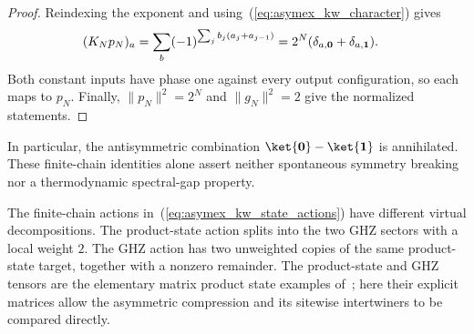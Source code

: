 \begin{proof}
    \leanok
    Reindexing the exponent and using~(\ref{eq:asymex_kw_character})
    gives
    \begin{align}
        (K_Np_N)_a
         & =\sum_b(-1)^{\sum_jb_j(a_j+a_{j-1})}
        =2^N(\delta_{a,\mathbf0}+\delta_{a,\mathbf1}).
        \notag
    \end{align}
    Both constant inputs have phase one against every output
    configuration, so each maps to $p_N$. Finally,
    $\|p_N\|^2=2^N$ and $\|g_N\|^2=2$ give the normalized statements.
\end{proof}

In particular, the antisymmetric combination
$\ket{\mathbf0}-\ket{\mathbf1}$ is annihilated. These finite-chain
identities alone assert neither spontaneous symmetry breaking nor a
thermodynamic spectral-gap property.

The finite-chain actions in~(\ref{eq:asymex_kw_state_actions}) have
different virtual decompositions. The product-state action splits into
the two GHZ sectors with a local weight $2$. The GHZ action has two
unweighted copies of the same product-state target, together with a
nonzero remainder. The product-state and GHZ tensors are the elementary
matrix product state examples of~\cite[Appendix~A]{Cirac2021Matrix};
here their explicit matrices allow the asymmetric compression and its
sitewise intertwiners to be compared directly.

